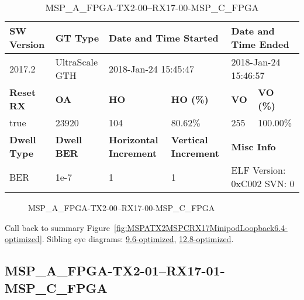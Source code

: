 \begin{table}[h]
\centering
\caption{MSP\_A\_FPGA-TX2-00--RX17-00-MSP\_C\_FPGA}
\label{tab:MSPAFPGATX200RX1700MSPCFPGA6.4-optimized}
\begin{tabular}{@{}|l|l|l|l|l|l|@{}}
\toprule
\textbf{SW Version}                & \textbf{GT Type}   & \multicolumn{2}{l|}{\textbf{Date and Time Started}}            & \multicolumn{2}{l|}{\textbf{Date and Time Ended}}        \\ \midrule
2017.2                       & UltraScale GTH          & \multicolumn{2}{l|}{2018-Jan-24 15:45:47}                   & \multicolumn{2}{l|}{2018-Jan-24 15:46:57}               \\ \midrule
\textbf{Reset RX}                  & \textbf{OA} & \textbf{HO}   & \textbf{HO (\%)} & \textbf{VO} & \textbf{VO (\%)} \\ \midrule
true & 23920        & 104          & 80.62\%        & 255        & 100.00\%       \\ \midrule
\textbf{Dwell Type}                & \textbf{Dwell BER} & \textbf{Horizontal Increment} & \textbf{Vertical Increment}    & \multicolumn{2}{l|}{\textbf{Misc Info}}                  \\ \midrule
BER                            & 1e-7        & 1        & 1           & \multicolumn{2}{l|}{ELF Version: 0xC002 SVN: 0}                         \\ \bottomrule
\end{tabular}
\end{table}

\begin{figure}[h]
\caption{MSP\_A\_FPGA-TX2-00--RX17-00-MSP\_C\_FPGA} \label{fig:MSPAFPGATX200RX1700MSPCFPGA6.4-optimized}
\end{figure}

Call back to summary Figure~\ref{fig:MSPATX2MSPCRX17MinipodLoopback6.4-optimized}.
Sibling eye diagrams: \hyperref[sec:MSPAFPGATX200RX1700MSPCFPGA9.6-optimized]{9.6-optimized}, \hyperref[sec:MSPAFPGATX200RX1700MSPCFPGA12.8-optimized]{12.8-optimized}.

\clearpage
\newpage


\subsection{MSP\_A\_FPGA-TX2-01--RX17-01-MSP\_C\_FPGA}\label{sec:MSPAFPGATX201RX1701MSPCFPGA6.4-optimized}

